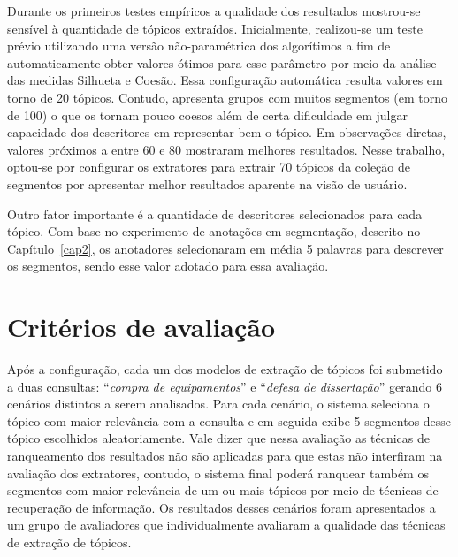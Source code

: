 Durante os primeiros testes empíricos a qualidade dos resultados mostrou-se sensível à quantidade de tópicos extraídos.
Inicialmente, realizou-se um teste prévio utilizando uma versão não-paramétrica dos algorítimos a fim de automaticamente obter valores ótimos para esse parâmetro por meio da análise das medidas Silhueta e Coesão. Essa configuração automática resulta valores em torno de 20 tópicos. Contudo, apresenta grupos com muitos segmentos (em torno de 100) o que os tornam pouco coesos além de certa dificuldade em julgar capacidade dos descritores em representar bem o tópico.  
Em observações diretas, valores próximos a entre 60 e 80 mostraram melhores resultados. Nesse trabalho, optou-se por configurar os extratores para extrair 70 tópicos da coleção de segmentos por apresentar melhor resultados aparente na visão de usuário.

Outro fator importante é a quantidade de descritores selecionados para cada tópico. Com base no experimento de anotações em segmentação, descrito no Capítulo~\ref{cap2}, os anotadores selecionaram em média 5 palavras para descrever os segmentos, sendo esse valor adotado para essa avaliação.




\section{Critérios de avaliação}


Após a configuração, cada um dos modelos de extração de tópicos foi submetido a duas consultas: ``\textit{compra de equipamentos}'' e ``\textit{defesa de dissertação}'' gerando 6 cenários distintos a serem analisados. 
Para cada cenário, o sistema seleciona o tópico com maior relevância com a consulta e em seguida exibe 5 segmentos desse tópico escolhidos aleatoriamente. 
Vale dizer que nessa avaliação as técnicas de ranqueamento dos resultados não são aplicadas para que estas não interfiram na avaliação dos extratores, contudo, o sistema final poderá ranquear também os segmentos com maior relevância de um ou mais tópicos por meio de técnicas de recuperação de informação. 
Os resultados desses cenários foram apresentados a um grupo de avaliadores que individualmente avaliaram a qualidade das técnicas de extração de tópicos. 
%

